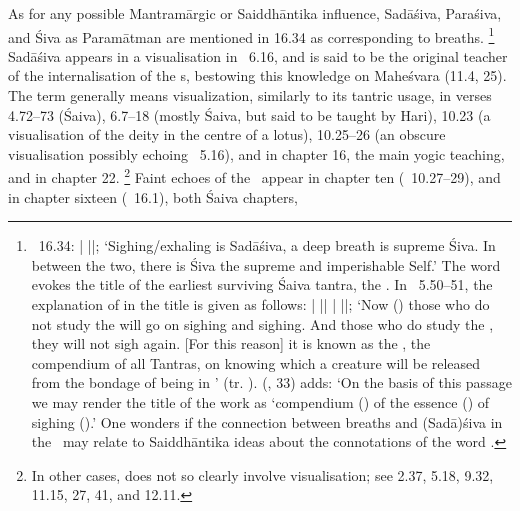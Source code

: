 As for any possible Mantramārgic or Saiddhāntika influence, Sadāśiva, Paraśiva, and Śiva as Paramātman are mentioned in 16.34 as corresponding to breaths.%
		\footnote{\VSS\ 16.34: 
						 |
		 ||;						
        `Sighing/exhaling is Sadāśiva, a deep breath is 
        supreme Śiva. In between the two, there is Śiva the 	
        supreme and imperishable Self.'
        The word  evokes the title of 
        the earliest surviving Śaiva tantra, the \Nisv.
        In \NisvUttara\ 5.50--51, the explanation of
         in the title is given as follows:
         |
		 ||
		 |
		 ||;
        `Now () those who do not study 
        the  will go on sighing and sighing.
        And those who do study the , 
        they will not sigh again. [For this reason] it is known
         as the , the compendium of all Tantras, 
         on knowing which a creature will be released from 
         the bondage of being in ' 
         (tr. ).  
         \citeauthor{KafleNisvasaBook} 	
         (\citeyear{KafleNisvasaBook}, {33}) adds:
         `On the basis of this passage we may render 
         the title of the work as `compendium () 	
         of the essence () of sighing ().'
		   One wonders if the connection between breaths
		   and (Sadā)śiva in the \VSS\ may relate to 
		   Saiddhāntika ideas about the connotations
		   of the word .}
Sadāśiva appears in a visualisation in \VSS\ 6.16, and is said to be the original teacher of the internalisation of the s, bestowing this knowledge on Maheśvara (11.4, 25).
The term  generally means visualization, similarly to its tantric usage, in verses 4.72--73 (Śaiva), 6.7--18 (mostly Śaiva, but said to be taught by Hari), 
10.23 (a visualisation of the deity in the centre of a lotus), 
10.25--26 (an obscure visualisation possibly echoing \NisvUttara\ 5.16), and in chapter 16, the main yogic teaching, and in chapter 22.%
		\footnote{In other cases,  does 
		not so clearly involve visualisation; see        
        2.37, 5.18, 9.32, 11.15, 27, 41, and 12.11.}
Faint echoes of the \NisvK\ appear in chapter ten (\VSS\ 10.27--29), and in chapter sixteen (\VSS\ 16.1), both Śaiva chapters,
